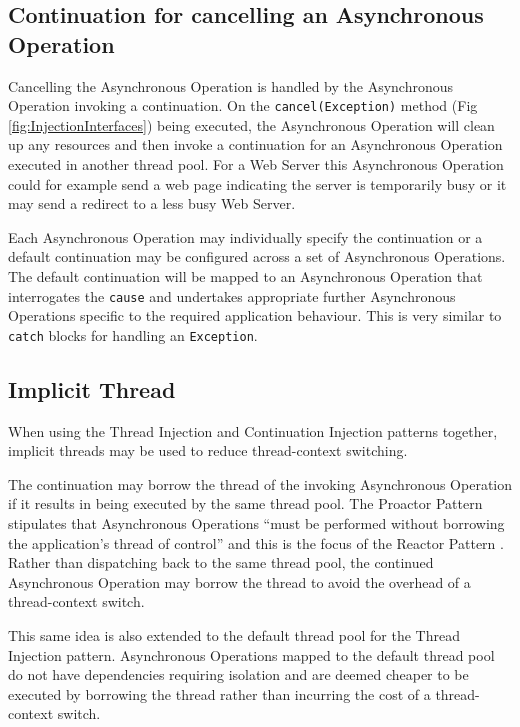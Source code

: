 \documentclass[prodmode]{style/acmlarge}
\begin{document}
\subsection{Continuation for cancelling an Asynchronous Operation}

Cancelling the Asynchronous Operation is handled by the Asynchronous Operation
invoking a continuation.  On the \texttt{cancel(Exception)} method (Fig
\ref{fig:InjectionInterfaces}) being executed, the Asynchronous Operation will
clean up any resources and then invoke a continuation for an Asynchronous
Operation executed in another thread pool.  For a Web Server this Asynchronous
Operation could for example send a web page indicating the server is temporarily
busy or it may send a redirect to a less busy Web Server.

Each Asynchronous Operation may individually specify the continuation or a
default continuation may be configured across a set of Asynchronous Operations.
The default continuation will be mapped to an Asynchronous Operation that
interrogates the \texttt{cause} and undertakes appropriate further Asynchronous
Operations specific to the required application behaviour.  This is very similar
to \texttt{catch} blocks for handling an \texttt{Exception}.


\subsection{Implicit Thread}

When using the Thread Injection and Continuation Injection patterns together,
implicit threads may be used to reduce thread-context switching.

The continuation may borrow the thread of the invoking Asynchronous Operation if
it results in being executed by the same thread pool.  The Proactor Pattern
stipulates that Asynchronous Operations ``must be performed without borrowing
the application's thread of control'' \cite[p. 8]{proactor} and this is the
focus of the Reactor Pattern \cite{reactor}.  Rather than dispatching back to
the same thread pool, the continued Asynchronous Operation may borrow the thread
to avoid the overhead of a thread-context switch.

This same idea is also extended to the default thread pool for the Thread
Injection pattern.  Asynchronous Operations mapped to the default thread pool do
not have dependencies requiring isolation and are deemed cheaper to be executed
by borrowing the thread rather than incurring the cost of a thread-context
switch.
\end{document}
